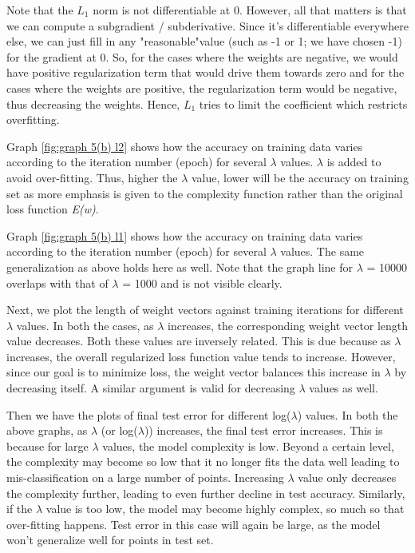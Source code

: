 \documentclass{article}
\begin{document}
Note that the $L_{1}$ norm is not differentiable at 0. However, all that matters is that we can compute a subgradient / subderivative. Since it's differentiable everywhere else, we can just fill in any "reasonable"value (such as -1 or 1; we have chosen -1) for the gradient at 0. So, for the cases where the weights are negative, we would have positive regularization term that would drive them towards zero and for the cases where the weights are positive, the regularization term would be negative, thus decreasing the weights. Hence, $L_{1}$ tries to limit the coefficient which restricts overfitting.

Graph \ref{fig:graph 5(b) l2} shows how the accuracy on training data varies according to the iteration number (epoch) for several $\lambda$ values. $\lambda$ is added to avoid over-fitting. Thus, higher the $\lambda$ value, lower will be the accuracy on training set as more emphasis is given to the complexity function rather than the original loss function \emph{E(w)}. 

Graph \ref{fig:graph 5(b) l1} shows how the accuracy on training data varies according to the iteration number (epoch) for several $\lambda$ values. The same generalization as above holds here as well. Note that the graph line for $\lambda$ = 10000 overlaps with that of $\lambda$ = 1000 and is not visible clearly.

Next, we plot the length of weight vectors against training iterations for different $\lambda$ values. In both the cases, as $\lambda$ increases, the corresponding weight vector length value decreases. Both these values are inversely related. This is due because as $\lambda$ increases, the overall regularized loss function value tends to increase. However, since our goal is to minimize loss, the weight vector balances this increase in $\lambda$ by decreasing itself. A similar argument is valid for decreasing $\lambda$ values as well.

Then we have the plots of final test error for different log($\lambda$) values. In both the above graphs, as $\lambda$ (or log($\lambda$)) increases, the final test error increases. This is because for large $\lambda$ values, the model complexity is low. Beyond a certain level, the complexity may become so low that it no longer fits the data well leading to mis-classification on a large number of points. Increasing $\lambda$ value only decreases the complexity further, leading to even further decline in test accuracy. Similarly, if the $\lambda$ value is too low, the model may become highly complex, so much so that over-fitting happens. Test error in this case will again be large, as the model won't generalize well for points in test set.
\end{document}
